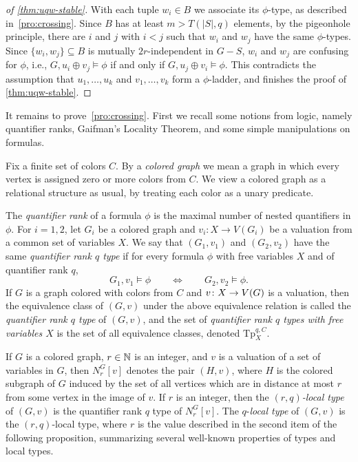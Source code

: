 \begin{proof}[of \cref{thm:uqw-stable}]
With each tuple $w_i\in B$ we associate its $\phi$-type, as described in~\cref{pro:crossing}.
Since $B$ has at least $m>T(|S|,q)$ elements, by
 the pigeonhole principle, there are $i$ and $j$ 
with $i<j$ such that $ w_i$ and $w_j$ have the same $\phi$-types. Since $\{w_i,w_j\}\subseteq B$ is mutually $2r$-independent in $G-S$, $w_i$ and $w_j$ are confusing for $\phi$, i.e., 
 $G,u_i\oplus v_j\models \phi$ 
 if and only if $G,u_j\oplus v_i\models \phi$. This contradicts the assumption that $u_1,\ldots, u_k$ and $ v_1,\ldots, v_k$ form a $\phi$-ladder, and finishes the proof of \cref{thm:uqw-stable}.
\end{proof}
It remains to prove~\cref{pro:crossing}. 
First we recall some notions from logic, namely quantifier ranks, Gaifman's Locality Theorem, and some simple manipulations on formulas.

 Fix a finite set of  colors $C$.
By a \emph{colored graph} we mean a graph  in which 
every vertex is assigned zero or more colors from $C$. We view a colored graph as a relational structure as usual, by treating each color as a unary predicate. 

The \emph{quantifier rank} of a formula $\phi$ is the maximal number of nested quantifiers in $\phi$.
For $i=1,2$, let $G_i$
be a colored graph and $v_i:X\to V(G_i)$ be a valuation
from a common set of variables $X$.
We say that $(G_1, v_1)$ and $(G_2,v_2)$
have the same \emph{quantifier rank $q$ type} %
if for every formula $\phi$ with  free variables $X$ and of quantifier rank $q$,
 $$G_1,v_1\models \phi\qquad\iff \qquad G_2,v_2\models \phi.$$
If $G$ is a graph colored with colors from $C$ and 
 $v\colon X\to V(G)$ is a valuation, 
then the equivalence class of $(G, v)$ under the above equivalence relation is called the \emph{quantifier rank $q$ type} of $(G,v)$, and  the set of \emph{quantifier rank $q$ types with  free variables $X$}
is the set of all equivalence classes, denoted
$\mathrm{Tp}^{q,C}_X$.

 If $G$ is a colored graph, $r\in\mathbb{N}$ is an integer, and $v$ is a valuation of a set of variables in $G$, then  $N^G_r[v]$ denotes the pair $(H,v)$, where $H$ is the colored subgraph of $G$
induced by the set of all vertices which are in distance at most $r$
from some vertex in the image of $v$.
If $r$ is an integer, then the \emph{$(r,q)$-local type} of $(G,v)$ is 
the quantifier rank $q$ type of $N^G_r[v]$. The $q$-\emph{local type} of $(G,v)$ is the $(r,q)$-local type, where $r$   is the value described in the second item of the following proposition,  summarizing several well-known properties of types and local types.


